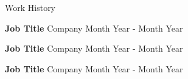 \documentclass{CIS_Grad/resume} %
\begin{document}

 


\begin{rSection}{Work History}
\vspace{-1.25em}
\item \textbf{Job Title} {Company} \hfill Month Year - Month Year
\item \textbf{Job Title} {Company} \hfill Month Year - Month Year
\item \textbf{Job Title} {Company} \hfill Month Year - Month Year
\end{rSection} 

\end{document}
